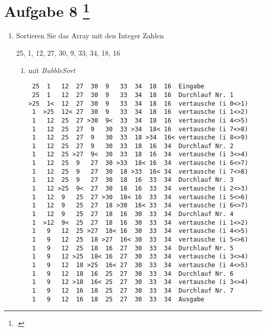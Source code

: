\documentclass{bschlangaul-aufgabe}
\begin{document}
\section{Aufgabe 8
\footcite{examen:46115:2016:03}}

\begin{enumerate}


\item Sortieren Sie das Array mit den Integer Zahlen

\begin{center}
25, 1, 12, 27, 30, 9, 33, 34, 18, 16
\end{center}

\begin{enumerate}


\item mit \emph{BubbleSort}

\begin{bAntwort}
\footnotesize
\begin{verbatim}
 25  1   12  27  30  9   33  34  18  16  Eingabe
 25  1   12  27  30  9   33  34  18  16  Durchlauf Nr. 1
>25  1<  12  27  30  9   33  34  18  16  vertausche (i 0<>1)
 1  >25  12< 27  30  9   33  34  18  16  vertausche (i 1<>2)
 1   12  25  27 >30  9<  33  34  18  16  vertausche (i 4<>5)
 1   12  25  27  9   30  33 >34  18< 16  vertausche (i 7<>8)
 1   12  25  27  9   30  33  18 >34  16< vertausche (i 8<>9)
 1   12  25  27  9   30  33  18  16  34  Durchlauf Nr. 2
 1   12  25 >27  9<  30  33  18  16  34  vertausche (i 3<>4)
 1   12  25  9   27  30 >33  18< 16  34  vertausche (i 6<>7)
 1   12  25  9   27  30  18 >33  16< 34  vertausche (i 7<>8)
 1   12  25  9   27  30  18  16  33  34  Durchlauf Nr. 3
 1   12 >25  9<  27  30  18  16  33  34  vertausche (i 2<>3)
 1   12  9   25  27 >30  18< 16  33  34  vertausche (i 5<>6)
 1   12  9   25  27  18 >30  16< 33  34  vertausche (i 6<>7)
 1   12  9   25  27  18  16  30  33  34  Durchlauf Nr. 4
 1  >12  9<  25  27  18  16  30  33  34  vertausche (i 1<>2)
 1   9   12  25 >27  18< 16  30  33  34  vertausche (i 4<>5)
 1   9   12  25  18 >27  16< 30  33  34  vertausche (i 5<>6)
 1   9   12  25  18  16  27  30  33  34  Durchlauf Nr. 5
 1   9   12 >25  18< 16  27  30  33  34  vertausche (i 3<>4)
 1   9   12  18 >25  16< 27  30  33  34  vertausche (i 4<>5)
 1   9   12  18  16  25  27  30  33  34  Durchlauf Nr. 6
 1   9   12 >18  16< 25  27  30  33  34  vertausche (i 3<>4)
 1   9   12  16  18  25  27  30  33  34  Durchlauf Nr. 7
 1   9   12  16  18  25  27  30  33  34  Ausgabe
\end{verbatim}
\end{bAntwort}


\end{enumerate}
\end{enumerate}
\end{document}
